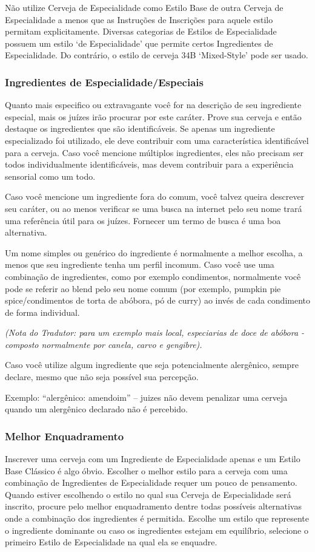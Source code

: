 Não utilize Cerveja de Especialidade como Estilo Base de outra Cerveja de Especialidade a menos que as Instruções de Inscrições para aquele estilo permitam explicitamente. Diversas categorias de Estilos de Especialidade possuem um estilo ‘de Especialidade’ que permite certos Ingredientes de Especialidade. Do contrário, o estilo de cerveja 34B ‘Mixed-Style’ pode ser usado.

\subsubsection*{Ingredientes de Especialidade/Especiais}
Quanto mais especifico ou extravagante você for na descrição de seu ingrediente especial, mais os juízes irão procurar por este caráter. Prove sua cerveja e então destaque os ingredientes que são identificáveis. Se apenas um ingrediente especializado foi utilizado, ele deve contribuir com uma característica identificável para a cerveja. Caso você mencione múltiplos ingredientes, eles não precisam ser todos individualmente identificáveis, mas devem contribuir para a experiência sensorial como um todo.

Caso você mencione um ingrediente fora do comum, você talvez queira descrever seu caráter, ou ao menos verificar se uma busca na internet pelo seu nome trará uma referência útil para os juízes. Fornecer um termo de busca é uma boa alternativa.

Um nome simples ou genérico do ingrediente é normalmente a melhor escolha, a menos que seu ingrediente tenha um perfil incomum. Caso você use uma combinação de ingredientes, como por exemplo condimentos, normalmente você pode se referir ao blend pelo seu nome comum (por exemplo, pumpkin pie spice/condimentos de torta de abóbora, pó de curry) ao invés de cada condimento de forma individual.

\textit{(Nota do Tradutor: para um exemplo mais local, especiarias de doce de abóbora - composto normalmente por canela, carvo e gengibre).}

Caso você utilize algum ingrediente que seja potencialmente alergênico, sempre declare, mesmo que não seja possível sua percepção.

Exemplo: “alergênico: amendoim” – juizes não devem penalizar uma cerveja quando um alergênico declarado não é percebido.

\subsubsection*{Melhor Enquadramento}
Inscrever uma cerveja com um Ingrediente de Especialidade apenas e um Estilo Base Clássico é algo óbvio. Escolher o melhor estilo para a cerveja com uma combinação de Ingredientes de Especialidade requer um pouco de pensamento. Quando estiver escolhendo o estilo no qual sua Cerveja de Especialidade será inscrito, procure pelo melhor enquadramento dentre todas possíveis alternativas onde a combinação dos ingredientes é permitida. Escolhe um estilo que represente o ingrediente dominante ou caso os ingredientes estejam em equilíbrio, selecione o primeiro Estilo de Especialidade na qual ela se enquadre.

